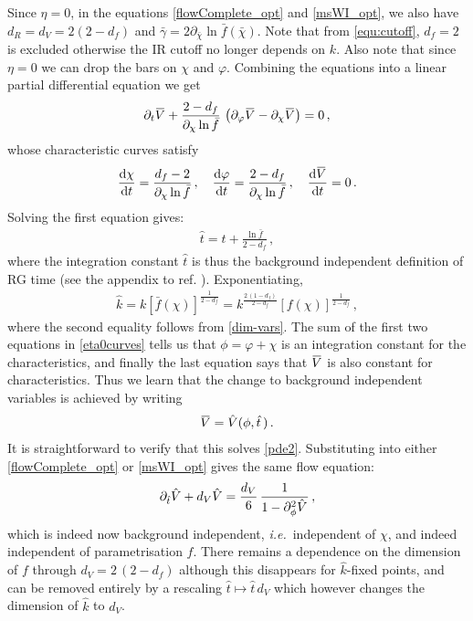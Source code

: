 \documentclass[11pt]{book} %
\newcommand{\overbar}[1]{\mkern 1.5mu\overline{\mkern-1.5mu#1\mkern-1.5mu}\mkern 1.5mu}
\newcommand{\bV}{\overbar V}
\newcommand\ie{\textit{i.e.}\ }
\newcommand{\vp}{\varphi}
\newcommand{\bc}{\bar \chi}
\newcommand{\hV}{\hat V}
\newcommand{\hk}{\hat k}
\newcommand{\hatt}{\hat t}
\numberwithin{equation}{chapter}
\begin{document}
Since $\eta=0$, in the equations \eqref{flowComplete_opt} and \eqref{msWI_opt},
we also have $d_R=d_V=2(2-d_f)$ and $\bar{\gamma}=2\partial_{\bc}\ln\bar{f}(\bc)$.
Note that from \eqref{equ:cutoff}, $d_f=2$ is excluded otherwise the IR cutoff no longer depends on $k$.
Also note that since $\eta=0$ we can drop the bars on $\chi$ and $\vp$.
Combining the equations into a linear partial differential equation we get
\begin{align}
  \label{pde2}
  \partial_t\bV +\frac{2-d_f}{\partial_{\chi}\ln\bar{f}} \,
  \left(\partial_{\vp}\bV-\partial_{\chi}\bV\right) =0\,,
\end{align}
whose characteristic curves satisfy
\begin{align}
  \label{eta0curves}
  \frac{\mathrm d\chi}{\mathrm dt}=\frac{d_f-2}{\partial_{\chi}\ln\bar{f}}\,,
  \quad
  \frac{\mathrm d\vp}{\mathrm dt}=\frac{2-d_f}{\partial_{\chi}\ln\bar{f}}\,,
  \quad
  \frac{\mathrm d\bV}{\mathrm dt}=0\,.
\end{align}
Solving the first equation gives:
\begin{align}
  \label{hatt}
  \hatt = t+\frac{\ln\bar{f}}{2-d_f}\,,
\end{align}
where the integration constant $\hatt$ is thus the background independent definition of RG time
(see the appendix to ref. \cite{Dietz:2015owa}). Exponentiating,
\begin{align}
  \hk = k \left[ \bar{f}(\chi) \right]^{\frac{1}{2-d_f}} = k^{\frac{2\,(1-d_f)}{2-d_f}}
  \left[ f(\chi) \right]^{\frac{1}{2-d_f}}\,,
\end{align}
where the second equality follows from \eqref{dim-vars}.
The sum of the first two equations in \eqref{eta0curves} tells us that $\phi=\vp+\chi$ is an
integration constant for the characteristics,
and finally the last equation says that $\bV$ is also constant for characteristics.
Thus we learn that the change to background independent variables is achieved by writing
\begin{align}
  \label{background-independent}
  \bV = \hV(\phi,\hatt\,)\,.
\end{align}
It is straightforward to verify that this solves \eqref{pde2}.
Substituting into either \eqref{flowComplete_opt} or \eqref{msWI_opt} gives the same flow equation:
\begin{align}
  \label{bi-flow}
  \partial_{\hatt}\hV +d_V\hV = \frac{d_V}{6} \, \frac{1}{1-\partial^2_\phi\hV^{\vphantom{H^H}}}\,,
\end{align}
which is indeed now background independent, \ie independent of $\chi$,
and indeed independent of parametrisation $f$.
There remains a dependence on the dimension of $f$ through $d_V = 2\,(2-d_f)$ although this disappears
for $\hk$-fixed points, and can be removed entirely by a rescaling $\hatt\mapsto \hatt\, d_V$ which however
changes the dimension of $\hat{k}$ to $d_V$.
\end{document}
